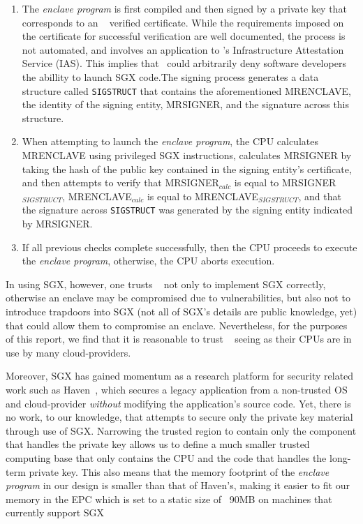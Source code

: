 \documentclass[../main.tex]{subfiles}
\begin{document}
\begin{enumerate}
  \item The \textit{enclave program} is first compiled and then signed
    by a private key that corresponds to an \Intel~ verified certificate.
    While the requirements imposed on the certificate for successful
    verification are well documented, the process is not automated, and
    involves an application to \Intel's Infrastructure Attestation Service
    (IAS). This implies that \Intel~could arbitrarily deny software
    developers the abillity to launch SGX code.The signing process
    generates a data structure called \texttt{SIGSTRUCT} that contains the
    aforementioned MRENCLAVE, the identity of the signing entity,
    MRSIGNER, and the signature across this structure.
  \item When attempting to launch the \textit{enclave program}, the
    CPU calculates MRENCLAVE using privileged SGX instructions, calculates
    MRSIGNER by taking the hash of the public key contained in the signing
    entity's certificate, and then attempts to verify that
    MRSIGNER$_{calc}$ is equal to MRSIGNER$_{SIGSTRUCT}$,
    MRENCLAVE$_{calc}$ is equal to MRENCLAVE$_{SIGSTRUCT}$, and that the
    signature across \texttt{SIGSTRUCT} was generated by the signing
    entity indicated by MRSIGNER.
  \item If all previous checks complete successfully, then the CPU
    proceeds to execute the \textit{enclave program}, otherwise, the CPU
    aborts execution.
\end{enumerate}

In using SGX, however, one trusts \Intel~ not only to implement SGX
correctly, otherwise an enclave may be compromised due to
vulnerabilities, but also not to introduce trapdoors into SGX (not all
of SGX's details are public knowledge, yet) that could allow them to
compromise an enclave. Nevertheless, for the purposes of this report,
we find that it is reasonable to trust \Intel~ seeing as their CPUs
are in use by many cloud-providers.

Moreover, SGX has gained momentum as a research platform for security
related work such as Haven~\cite{Baumann14}, which secures a legacy
application from a non-trusted OS and cloud-provider \textit{without}
modifying the application's source code. Yet, there is no work, to our
knowledge, that attempts to secure only the private key material
through use of SGX. Narrowing the trusted region to contain only the
component that handles the private key allows us to define a much
smaller trusted computing base that only contains the CPU and the code
that handles the long-term private key. This also means that the
memory footprint of the \textit{enclave program} in our design is
smaller than that of Haven's, making it easier to fit our memory in
the EPC which is set to a static size of ~90MB on machines that
currently support SGX
\end{document}
